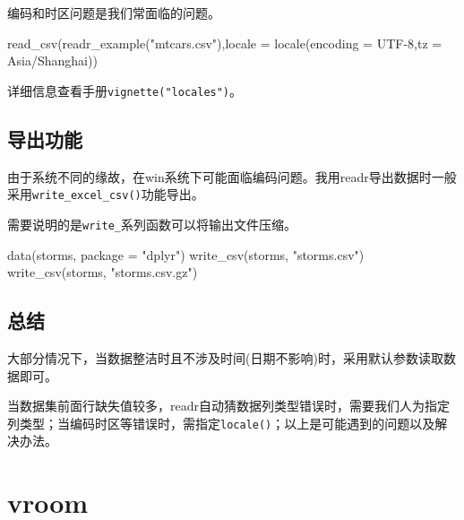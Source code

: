 \documentclass[
]{book}
\newenvironment{Shaded}{\begin{snugshade}}{\end{snugshade}}
\newcommand{\AttributeTok}[1]{\textcolor[rgb]{0.77,0.63,0.00}{#1}}
\newcommand{\FunctionTok}[1]{\textcolor[rgb]{0.00,0.00,0.00}{#1}}
\newcommand{\NormalTok}[1]{#1}
\newcommand{\StringTok}[1]{\textcolor[rgb]{0.31,0.60,0.02}{#1}}
\begin{document}
编码和时区问题是我们常面临的问题。

\begin{Shaded}
\begin{Highlighting}[]
\FunctionTok{read\_csv}\NormalTok{(}\FunctionTok{readr\_example}\NormalTok{(}\StringTok{"mtcars.csv"}\NormalTok{),}\AttributeTok{locale =} \FunctionTok{locale}\NormalTok{(}\AttributeTok{encoding =} \StringTok{\textquotesingle{}UTF{-}8\textquotesingle{}}\NormalTok{,}\AttributeTok{tz =} \StringTok{\textquotesingle{}Asia/Shanghai\textquotesingle{}}\NormalTok{))}
\end{Highlighting}
\end{Shaded}

详细信息查看手册\texttt{vignette("locales")}。

\hypertarget{readr:write-function}{%
\subsection{导出功能}\label{readr:write-function}}

由于系统不同的缘故，在win系统下可能面临编码问题。我用readr导出数据时一般采用\texttt{write\_excel\_csv()}功能导出。

需要说明的是\texttt{write\_}系列函数可以将输出文件压缩。

\begin{Shaded}
\begin{Highlighting}[]
\FunctionTok{data}\NormalTok{(storms, }\AttributeTok{package =} \StringTok{"dplyr"}\NormalTok{)}
\FunctionTok{write\_csv}\NormalTok{(storms, }\StringTok{"storms.csv"}\NormalTok{)}
\FunctionTok{write\_csv}\NormalTok{(storms, }\StringTok{"storms.csv.gz"}\NormalTok{)}
\end{Highlighting}
\end{Shaded}

\hypertarget{ux603bux7ed3-1}{%
\subsection{总结}\label{ux603bux7ed3-1}}

大部分情况下，当数据整洁时且不涉及时间(日期不影响)时，采用默认参数读取数据即可。

当数据集前面行缺失值较多，readr自动猜数据列类型错误时，需要我们人为指定列类型；当编码时区等错误时，需指定\texttt{locale()}；以上是可能遇到的问题以及解决办法。

\hypertarget{data:vroom}{%
\section{vroom}\label{data:vroom}}
\end{document}
